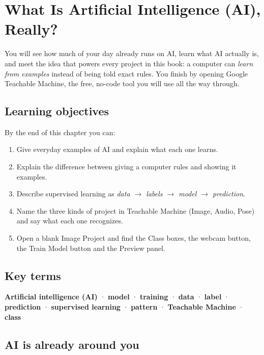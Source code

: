 \chapter{What Is Artificial Intelligence (AI), Really?}

\begin{glancebox}
You will see how much of your day already runs on AI, learn what AI actually is, and meet the idea that powers every project in this book: a computer can \emph{learn from examples} instead of being told exact rules. You finish by opening Google Teachable Machine, the free, no-code tool you will use all the way through.
\end{glancebox}

\section*{Learning objectives}

By the end of this chapter you can:


\begin{enumerate}
\item Give everyday examples of AI and explain what each one learns.
\item Explain the difference between giving a computer rules and showing it examples.
\item Describe supervised learning as \emph{data \ensuremath{\rightarrow} labels \ensuremath{\rightarrow} model \ensuremath{\rightarrow} prediction}.
\item Name the three kinds of project in Teachable Machine (Image, Audio, Pose) and say what each one recognizes.
\item Open a blank Image Project and find the Class boxes, the webcam button, the Train Model button and the Preview panel.
\end{enumerate}

\section*{Key terms}

\textbf{Artificial intelligence (AI)} · \textbf{model} · \textbf{training} · \textbf{data} · \textbf{label} · \textbf{prediction} · \textbf{supervised learning} · \textbf{pattern} · \textbf{Teachable Machine} · \textbf{class}


\section{AI is already around you}


